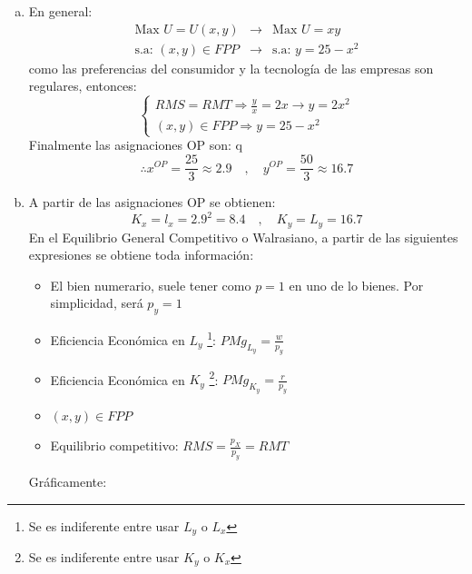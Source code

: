 \begin{enumerate}[a)]
\begin{center}
		  	\end{center}
	\item En general:
				$$
					\begin{array}{ccc}
						\text{Max } U = U\left( x,y\right) & \rightarrow & \text{Max } U = xy\\[0.3cm]
						\text{s.a: } (x,y) \in FPP & \rightarrow & \text{s.a: } y = 25 -x^2
					\end{array}
				$$
		  como las preferencias del consumidor y la tecnología de las empresas son regulares, entonces:
		  		$$	\left\{
						  \begin{array}{l}
						  	 RMS = RMT \Rightarrow \frac{y}{x} = 2x \rightarrow y = 2x^2\\ [.5cm]
						  	 (x,y) \in FPP \Rightarrow y = 25 - x^2
						  \end{array}
					 \right.
		  		$$
		  Finalmente las asignaciones OP son:
		  			q$$\therefore x^{OP} = \frac{25}{3} \approx 2.9 \quad , \quad y^{OP} = \frac{50}{3} \approx 16.7$$
	\item A partir de las asignaciones OP se obtienen:
			$$K_x = l_x = 2.9^2 = 8.4 \quad , \quad K_y = L_y = 16.7$$
		  En el Equilibrio General Competitivo o Walrasiano, a partir de las siguientes expresiones se obtiene toda información:
		  	\begin{itemize}
		  		\item El bien numerario, suele tener como $p =1$ en uno de lo bienes. Por simplicidad, será $p_y = 1$
		  		\item Eficiencia Económica en $L_y$ \footnote{Se es indiferente entre usar $L_y$ o $L_x$}: $PMg_{L_y} = \frac{w}{p_y}$
		  		\item Eficiencia Económica en $K_y$ \footnote{Se es indiferente entre usar $K_y$ o $K_x$}: $PMg_{K_y} = \frac{r}{p_y}$
		  		\item $(x,y) \in FPP$
		  		\item Equilibrio competitivo: $RMS = \frac{p_X}{p_y} = RMT$
		  	\end{itemize}
	  	  Gráficamente:
			\begin{center}
\end{center}
\end{enumerate}
